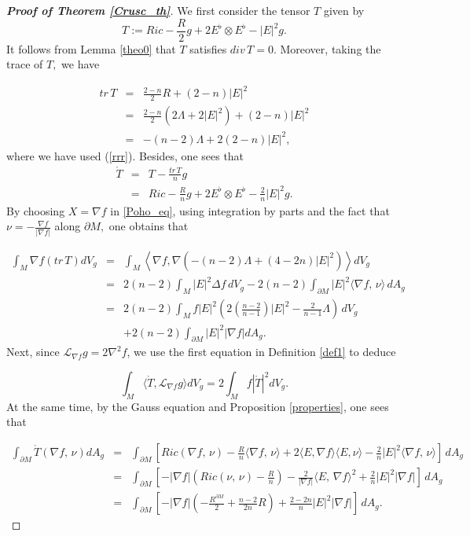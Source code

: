 \documentclass{amsart}
\numberwithin{equation}{section}
\begin{document}
\begin{proof}[{\bf Proof of Theorem \ref{Crusc_th}}]
		We first consider the tensor $T$ given by 
		\[
		T := {Ric} - \frac{R}{2} g + 2 E^{\flat} \otimes E^{\flat} - |E|^{2} g.
		\]  It follows from Lemma \ref{theo0} that $T$ satisfies $div\,T=0.$ Moreover, taking the trace of $T,$ we have
		
		\begin{eqnarray*}
			tr\, T &=&\frac{2-n}{2}R+(2-n)|E|^{2}\\
			&=&
			\frac{2-n}{2}\left(2\Lambda+2|E|^{2}\right)+(2-n)|E|^{2}\\
			&=&-(n-2)\Lambda+2(2-n)|E|^{2},
		\end{eqnarray*} where we have used (\ref{rrr}). Besides, one sees that 
				\begin{eqnarray*}
			\mathring{T}&=&T-\frac{tr\,T}{n}g\\
			&=&Ric-\frac{R}{n}g+2 E^{\flat} \otimes E^{\flat} - \frac{2}{n}|E|^{2} g.
		\end{eqnarray*} By choosing $X=\nabla f$ in \eqref{Poho_eq}, using integration by parts and the fact that $\nu=-\frac{\nabla f}{|\nabla f|}$ along $\partial M,$ one obtains that
		
		\begin{eqnarray}
		\label{eqnbv86000}
				\int_{M}\nabla f (tr\, T) dV_g &=&\int_{M}\left\langle\nabla f,\nabla\left(-(n-2)\Lambda+(4-2n)|E|^{2}\right)\right\rangle dV_g\nonumber\\
				&=&2(n-2)\int_{M}|E|^{2}\Delta f\, dV_g-2(n-2)\int_{\partial M}|E|^{2}\langle\nabla f,\, \nu\rangle\,dA_g\nonumber\\
				&=&2(n-2)\int_{M}f|E|^{2}\left(2\left(\frac{n-2}{n-1}\right)|E|^{2}-\frac{2}{n-1}\Lambda\right)\,dV_g\nonumber\\
				&& + 2(n-2)\int_{\partial M}|E|^{2}|\nabla f|dA_g.
			\end{eqnarray}
Next, since $\mathcal{L}_{\nabla f}g=2\nabla^{2}f$, we use the first equation in Definition \ref{def1} to deduce

\begin{equation}
\label{eqnbv860}
\int_{M}\langle\mathring{T},\mathcal{L}_{\nabla f}g\rangle dV_g=2\int_{M}f|\mathring{T}|^{2}dV_g.
\end{equation}
At the same time, by the Gauss equation and Proposition \ref{properties}, one sees that
			

			\begin{eqnarray}
			\label{eqnbv8602}
				\int_{\partial M}\mathring{T}(\nabla f,\,\nu)dA_g&=&\int_{\partial M}\left[Ric(\nabla f,\, \nu)-\frac{R}{n}\langle\nabla f,\, \nu\rangle+2\langle E,\nabla f\rangle\langle E,\nu\rangle-\frac{2}{n}|E|^{2}\langle\nabla f,\, \nu\rangle\right]\,dA_g\nonumber\\
				&=&\int_{\partial M}\left[-|\nabla f|\left(Ric(\nu,\,\nu)-\frac{R}{n}\right)-\frac{2}{|\nabla f|}\langle E,\,\nabla f\rangle^{2}+\frac{2}{n}|E|^{2}|\nabla f|\right]\,dA_g\nonumber\\
				&=&\int_{\partial M}\left[-|\nabla f|\left(-\frac{R^{\partial M}}{2}+\frac{n-2}{2n}R\right)+\frac{2-2n}{n}|E|^{2}|\nabla f|\right]\,dA_g.
			\end{eqnarray}
			

\end{proof}
\end{document}
